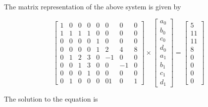 \documentclass[
]{book}
\begin{document}
The matrix representation of the above system is given by

\[
 \begin{bmatrix} 
 1 & 0 & 0 & 0 & 0 & 0 & 0 & 0 \\ 
 1 & 1 & 1 & 1 & 0 & 0 & 0 & 0 \\ 
 0 & 0 & 0 & 0 & 1 & 0 & 0 & 0 \\
 0 & 0 & 0 & 0 & 1 & 2 & 4 & 8 \\
 0 & 1 & 2 & 3 & 0 & -1 & 0 & 0 \\
 0 & 0 & 1 & 3 & 0 & 0 & -1 & 0 \\
 0 & 0 & 0 & 1 & 0 & 0 & 0 & 0 \\
 0 & 1 & 0 & 0 & 0 & 01 & 0 & 1 
 \end{bmatrix} \times \left[ \begin{array}{c} a_0 \\b_0\\c_0\\d_0 \\ a_1\\b_1\\c_1\\d_1 \end{array} \right] =\left[ \begin{array}{c} 5 \\ 11\\11\\8\\0\\0\\0\\0 \end{array} \right] 
\]

The solution to the equation is
\end{document}

